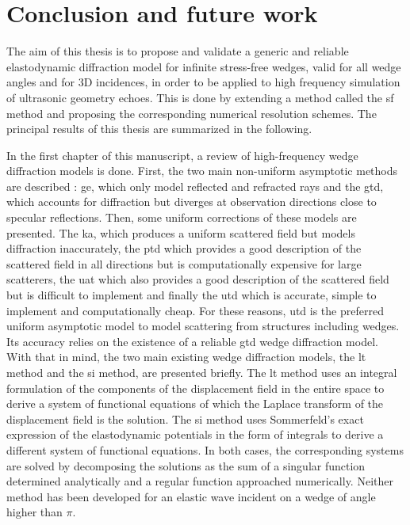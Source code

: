 \chapter*{Conclusion and future work}

The aim of this thesis is to propose and validate a generic and reliable elastodynamic diffraction model for infinite stress-free wedges, valid for all wedge angles and for 3D incidences, in order to be applied to high frequency simulation of ultrasonic geometry echoes. This is done by extending a method called the \acrfull{sf} method and proposing the corresponding numerical resolution schemes. The principal results of this thesis are summarized in the following.

In the first chapter of this manuscript, a review of high-frequency wedge diffraction models is done. First, the two main non-uniform asymptotic methods are described : \acrfull{ge}, which only model reflected and refracted rays and the \acrfull{gtd}, which accounts for diffraction but diverges at observation directions close to specular reflections. Then, some uniform corrections of these models are presented. The \acrfull{ka}, which produces a uniform scattered field but models diffraction inaccurately, the \acrfull{ptd} which provides a good description of the scattered field in all directions but is computationally expensive for large scatterers, the \acrfull{uat} which also provides a good description of the scattered field but is difficult to implement and finally the \acrfull{utd} which is accurate, simple to implement and computationally cheap. For these reasons, \acrshort{utd} is the preferred uniform asymptotic model to model scattering from structures including wedges. Its accuracy relies on the existence of a reliable \acrshort{gtd} wedge diffraction model. With that in mind, the two main existing wedge diffraction models, the \acrfull{lt} method and the \acrfull{si} method, are presented briefly. The \acrshort{lt} method uses an integral formulation of the components of the displacement field in the entire space to derive a system of functional  equations of which the Laplace transform of the displacement field is the solution. The \acrshort{si} method uses Sommerfeld's exact expression of the elastodynamic potentials in the form of integrals to derive a different system of functional equations. In both cases, the corresponding systems are solved by decomposing the solutions as the sum of a singular function determined analytically and a regular function approached numerically. Neither method has been developed for an elastic wave incident on a wedge of angle higher than $\pi$.

